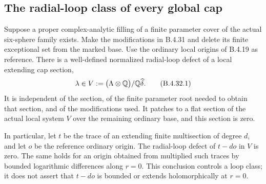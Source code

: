 \subsection{The radial-loop class of every global cap}

\begin{proposition}
\label{push:B432}
Suppose a proper complex-analytic filling of a finite parameter
cover of the actual six-sphere family exists. Make the
modifications in B.4.31 and delete its finite exceptional set
from the marked base. Use the ordinary local origins of
B.4.19 as reference. There is a well-defined normalized
radial-loop defect of a local extending cap section,
\[
 \lambda\in
 V:=\bigl(\Lambda\otimes\mathbb Q\bigr)/\mathbb Q\widehat\delta .
 \tag{B.4.32.1}
\]
It is independent of the section, of the finite parameter root
needed to obtain that section, and of the modifications used.
It patches to a flat section of the actual local system $V$
over the remaining ordinary base, and this section is zero.

In particular, let $t$ be the trace of an extending finite
multisection of degree $d$, and let $o$ be the reference ordinary
origin. The radial-loop defect of $t-do$ in $V$ is zero.
The same holds for an origin obtained from multiplied such
traces by bounded logarithmic differences along $r=0$.
This conclusion controls a loop class; it does not assert
that $t-do$ is bounded or extends holomorphically at $r=0$.
\end{proposition}

